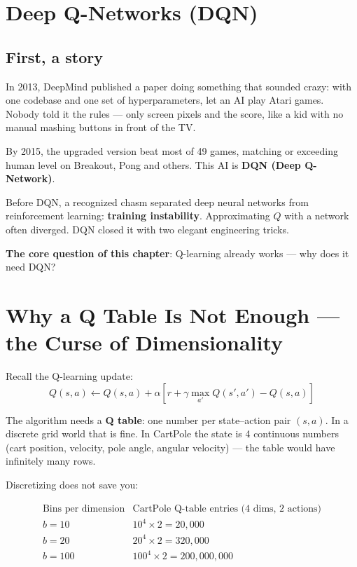 \documentclass{article}
\begin{document}
\section*{Deep Q-Networks (DQN)}

\subsection*{First, a story}

In 2013, DeepMind published a paper doing something that sounded crazy: with one codebase and one set of hyperparameters, let an AI play Atari games. Nobody told it the rules --- only screen pixels and the score, like a kid with no manual mashing buttons in front of the TV.

By 2015, the upgraded version beat most of 49 games, matching or exceeding human level on Breakout, Pong and others. This AI is \textbf{DQN (Deep Q-Network)}.

Before DQN, a recognized chasm separated deep neural networks from reinforcement learning: \textbf{training instability}. Approximating $Q$ with a network often diverged. DQN closed it with two elegant engineering tricks.

\textbf{The core question of this chapter}: Q-learning already works --- why does it need DQN?

\section*{Why a Q Table Is Not Enough --- the Curse of Dimensionality}

Recall the Q-learning update:
\[
Q(s,a) \leftarrow Q(s,a) + \alpha\!\left[r + \gamma \max_{a'} Q(s',a') - Q(s,a)\right]
\]

The algorithm needs a \textbf{Q table}: one number per state--action pair $(s,a)$. In a discrete grid world that is fine. In CartPole the state is 4 continuous numbers (cart position, velocity, pole angle, angular velocity) --- the table would have infinitely many rows.

Discretizing does not save you:

\[
\begin{array}{c|c}
\text{Bins per dimension} & \text{CartPole Q-table entries (4 dims, 2 actions)} \\
\hline
b = 10  & 10^4 \times 2 = 20{,}000 \\
b = 20  & 20^4 \times 2 = 320{,}000 \\
b = 100 & 100^4 \times 2 = 200{,}000{,}000 \\
\end{array}
\]
\end{document}
